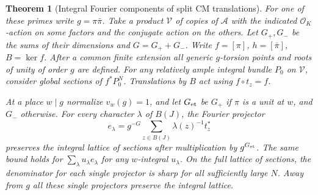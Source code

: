 \documentclass[a4paper,11pt]{article}
\newtheorem{theorem}[proposition]{Theorem}
\theoremstyle{definition}
\theoremstyle{remark}
\numberwithin{equation}{section}
\newcommand{\OO}{\mathcal O}
\begin{document}
\begin{theorem}[Integral Fourier components of split CM translations]\label{thm:fourier49}
For one of these primes write \(g=\pi\bar\pi\). Take a product
\(\mathcal V\) of copies of \(\mathcal A\) with the indicated
\(\OO_K\)-action on some factors and the conjugate action on the others.
Let \(G_+,G_-\) be the sums of their dimensions and \(G=G_++G_-\).
Write \(f=[\pi]\), \(h=[\bar\pi]\), \(B=\ker f\). After a common
finite extension all generic \(g\)-torsion points and roots of unity
of order \(g\) are defined. For any relatively ample integral bundle
\(P_0\) on \(\mathcal V\), consider global sections of \(f^*P_0^N\).
Translations by \(B\) act using \(f\circ t_z=f\).

At a place \(w\mid g\) normalize \(v_w(g)=1\), and let \(G_{\rm et}\)
be \(G_+\) if \(\pi\) is a unit at \(w\), and \(G_-\) otherwise.
For every character \(\lambda\) of \(B(J)\), the Fourier projector
\[
       e_\lambda= g^{-G}\sum_{z\in B(J)}
                         \lambda(z)^{-1}t_z^*
\]
preserves the integral lattice of sections after multiplication by
\(g^{G_{\rm et}}\). The same bound holds for
\(\sum_\lambda u_\lambda e_\lambda\) for any \(w\)-integral
\(u_\lambda\). On the full lattice of sections, the denominator for
each single projector is sharp for all sufficiently large \(N\).
Away from \(g\) all these single projectors preserve the integral lattice.
\end{theorem}
\end{document}
